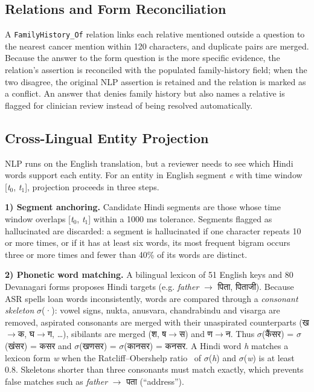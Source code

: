 \documentclass[conference]{IEEEtran}
\begin{document}
\subsection{Relations and Form Reconciliation}
A \texttt{FamilyHistory\_Of} relation links each relative mentioned outside a question to the nearest cancer mention within 120 characters, and duplicate pairs are merged. Because the answer to the form question is the more specific evidence, the relation's assertion is reconciled with the populated family-history field; when the two disagree, the original NLP assertion is retained and the relation is marked as a conflict. An answer that denies family history but also names a relative is flagged for clinician review instead of being resolved automatically.

\subsection{Cross-Lingual Entity Projection}
NLP runs on the English translation, but a reviewer needs to see which Hindi words support each entity. For an entity in English segment \emph{e} with time window [\emph{t}$_0$, \emph{t}$_1$], projection proceeds in three steps.

\textbf{1) Segment anchoring.} Candidate Hindi segments are those whose time window overlaps [\emph{t}$_0$, \emph{t}$_1$] within a 1000 ms tolerance. Segments flagged as hallucinated are discarded: a segment is hallucinated if one character repeats 10 or more times, or if it has at least six words, its most frequent bigram occurs three or more times and fewer than 40\% of its words are distinct.

\textbf{2) Phonetic word matching.} A bilingual lexicon of 51 English keys and 80 Devanagari forms proposes Hindi targets (e.g. \emph{father} $\rightarrow$ {\dev पिता, पिताजी}). Because ASR spells loan words inconsistently, words are compared through a \emph{consonant skeleton} $\sigma$(·): vowel signs, nukta, anusvara, chandrabindu and visarga are removed, aspirated consonants are merged with their unaspirated counterparts ({\dev ख}$\rightarrow${\dev क, घ}$\rightarrow${\dev ग}, \ldots{}), sibilants are merged ({\dev श, ष}$\rightarrow${\dev स}) and {\dev ण}$\rightarrow${\dev न}. Thus $\sigma$({\dev कैंसर}) = $\sigma$({\dev खंसर}) = {\dev कसर} and $\sigma$({\dev खणसर}) = $\sigma$({\dev कानसर}) = {\dev कनसर}. A Hindi word \emph{h} matches a lexicon form \emph{w} when the Ratcliff–Obershelp ratio~\cite{ratcliff} of $\sigma$(\emph{h}) and $\sigma$(\emph{w}) is at least 0.8. Skeletons shorter than three consonants must match exactly, which prevents false matches such as \emph{father} $\rightarrow$ {\dev पता} (“address”).
\end{document}
